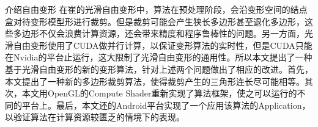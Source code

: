 
\begin{cabstract}
    介绍自由变形
    在崔的光滑自由变形中\cite{Cui15}，算法在预处理阶段，会沿变形空间的结点盒对待变形模型形进行裁剪。但是裁剪可能会产生狭长多边形甚至退化多边形，这些多边形不仅会浪费计算资源，还会带来精度和程序鲁棒性的问题。另一方面，光滑自由变形使用了CUDA做并行计算，以保证变形算法的实时性，但是CUDA只能在Nvidia的平台止运行，这大限制了光滑自由变形的通用性。所以本文提出了一种基于光滑自由变形的新的变形算法，针对上述两个问题做出了相应的改进。首先，本文提出了一种新的多边形裁剪算法，使得裁剪产生的三角形连长尽可能相等。其次，本文用OpenGL的Compute Shader重新实现了算法框架，使之可以运行的不同的平台上。最后，本文还的Android平台实现了一个应用该算法的Application，以验证算法在计算资源较匮乏的情境下的表现。
\end{cabstract}

